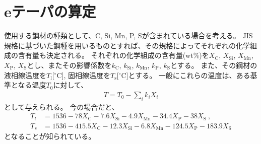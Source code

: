 


\section{eテーパの算定}
使用する鋼材の種類として、C, Si, Mn, P, Sが含まれている場合を考える。
JIS規格に基づいた鋼種を用いるものとすれば、その規格によってそれぞれの化学組成の含有量も決定される。
それぞれの化学組成の含有量($\mathrm{wt}\%$)を$X_\mathrm C$, $X_\mathrm{Si}$, $X_\mathrm{Mn}$, $X_\mathrm P$, $X_\mathrm S$とし、またその影響係数を$k_\mathrm C$, $k_\mathrm{Si}$, $k_\mathrm{Mn}$, $k_\mathrm P$, $k_\mathrm S$とする。
また、その鋼材の液相線温度を$T_\mathrm l$[$^\circ\mathrm C$], 固相線温度を$T_\mathrm s$[$^\circ\mathrm C$]とする。
一般にこれらの温度は、ある基準となる温度$T_0$に対して、
\begin{align*}
  T = T_0-\sum_i k_iX_i
\end{align*}
として与えられる。
今の場合だと、
\begin{align*}
  T_l
  &= 1536-78X_\mathrm C-7.6X_\mathrm{Si}-4.9X_\mathrm{Mn}-34.4X_\mathrm P-38X_\mathrm S~,\\
  T_s
  &= 1536-415.5X_\mathrm C-12.3X_\mathrm{Si}-6.8X_\mathrm{Mn}-124.5X_\mathrm P-183.9X_\mathrm S
\end{align*}
となることが知られている\cite{1986KO}。
